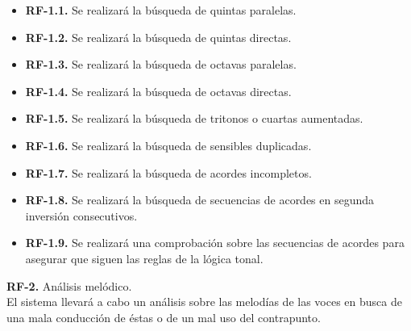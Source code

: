 \begin{itemize}

	\bigskip
	\item \textbf{RF-1.1.} Se realizará la búsqueda de quintas paralelas.

	\bigskip
	\item \textbf{RF-1.2.} Se realizará la búsqueda de quintas directas.

	\bigskip
	\item \textbf{RF-1.3.} Se realizará la búsqueda de octavas paralelas.

	\bigskip
	\item \textbf{RF-1.4.} Se realizará la búsqueda de octavas directas.

	\bigskip
	\item \textbf{RF-1.5.} Se realizará la búsqueda de tritonos o cuartas aumentadas.

	\bigskip
	\item \textbf{RF-1.6.} Se realizará la búsqueda de sensibles duplicadas.

	\bigskip
	\item \textbf{RF-1.7.} Se realizará la búsqueda de acordes incompletos.

	\bigskip
	\item \textbf{RF-1.8.} Se realizará la búsqueda de secuencias de acordes en segunda inversión consecutivos.

	\bigskip
	\item \textbf{RF-1.9.} Se realizará una comprobación sobre las secuencias de acordes para asegurar que siguen las reglas de la lógica tonal.

\end{itemize}

\bigskip
\textbf{RF-2.} Análisis melódico.\\
El sistema llevará a cabo un análisis sobre las melodías de las voces en busca de una mala conducción de éstas o de un mal uso del contrapunto.

